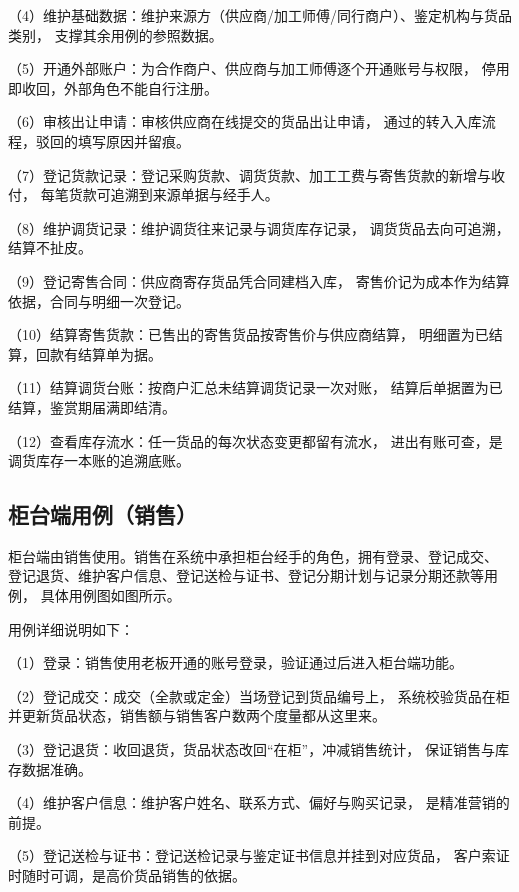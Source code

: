 \noindent（4）维护基础数据：维护来源方（供应商/加工师傅/同行商户）、鉴定机构与货品类别，
支撑其余用例的参照数据。

\noindent（5）开通外部账户：为合作商户、供应商与加工师傅逐个开通账号与权限，
停用即收回，外部角色不能自行注册。

\noindent（6）审核出让申请：审核供应商在线提交的货品出让申请，
通过的转入入库流程，驳回的填写原因并留痕。

\noindent（7）登记货款记录：登记采购货款、调货货款、加工工费与寄售货款的新增与收付，
每笔货款可追溯到来源单据与经手人。

\noindent（8）维护调货记录：维护调货往来记录与调货库存记录，
调货货品去向可追溯，结算不扯皮。

\noindent（9）登记寄售合同：供应商寄存货品凭合同建档入库，
寄售价记为成本作为结算依据，合同与明细一次登记。

\noindent（10）结算寄售货款：已售出的寄售货品按寄售价与供应商结算，
明细置为已结算，回款有结算单为据。

\noindent（11）结算调货台账：按商户汇总未结算调货记录一次对账，
结算后单据置为已结算，鉴赏期届满即结清。

\noindent（12）查看库存流水：任一货品的每次状态变更都留有流水，
进出有账可查，是调货库存一本账的追溯底账。

\subsection{柜台端用例（销售）}

柜台端由销售使用。销售在系统中承担柜台经手的角色，拥有登录、登记成交、
登记退货、维护客户信息、登记送检与证书、登记分期计划与记录分期还款等用例，
具体用例图如图所示。


用例详细说明如下：

\noindent（1）登录：销售使用老板开通的账号登录，验证通过后进入柜台端功能。

\noindent（2）登记成交：成交（全款或定金）当场登记到货品编号上，
系统校验货品在柜并更新货品状态，销售额与销售客户数两个度量都从这里来。

\noindent（3）登记退货：收回退货，货品状态改回“在柜”，冲减销售统计，
保证销售与库存数据准确。

\noindent（4）维护客户信息：维护客户姓名、联系方式、偏好与购买记录，
是精准营销的前提。

\noindent（5）登记送检与证书：登记送检记录与鉴定证书信息并挂到对应货品，
客户索证时随时可调，是高价货品销售的依据。

